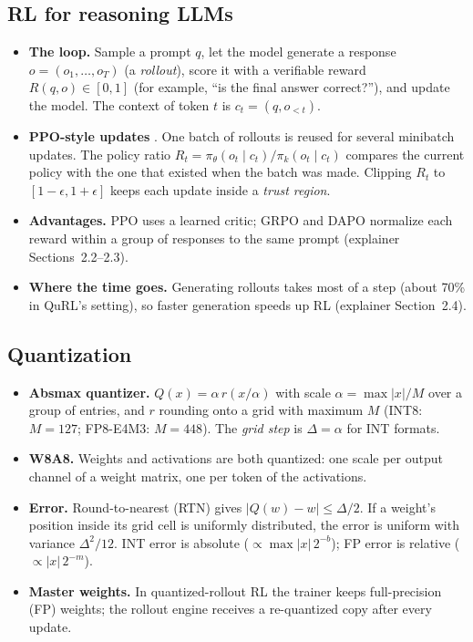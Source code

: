 \documentclass[11pt]{article}
\begin{document}
\subsection{RL for reasoning LLMs}
\begin{itemize}
\item \textbf{The loop.} Sample a prompt $q$, let the model generate a response $o=(o_1,\dots,o_T)$ (a \emph{rollout}), score it with a verifiable reward $R(q,o)\in[0,1]$ (for example, ``is the final answer correct?''), and update the model. The context of token $t$ is $c_t=(q,o_{<t})$.
\item \textbf{PPO-style updates} \citep{schulman2017ppo}. One batch of rollouts is reused for several minibatch updates. The policy ratio $R_t=\pi_\theta(o_t\mid c_t)/\pi_k(o_t\mid c_t)$ compares the current policy with the one that existed when the batch was made. Clipping $R_t$ to $[1-\epsilon,1+\epsilon]$ keeps each update inside a \emph{trust region}.
\item \textbf{Advantages.} PPO uses a learned critic; GRPO \citep{shao2024deepseekmath} and DAPO \citep{yu2025dapo} normalize each reward within a group of responses to the same prompt (explainer Sections~2.2--2.3).
\item \textbf{Where the time goes.} Generating rollouts takes most of a step (about 70\% in QuRL's setting), so faster generation speeds up RL (explainer Section~2.4).
\end{itemize}

\subsection{Quantization}
\begin{itemize}
\item \textbf{Absmax quantizer.} $Q(x)=\alpha\,r(x/\alpha)$ with scale $\alpha=\max|x|/M$ over a group of entries, and $r$ rounding onto a grid with maximum $M$ (INT8: $M=127$; FP8-E4M3: $M=448$). The \emph{grid step} is $\Delta=\alpha$ for INT formats.
\item \textbf{W8A8.} Weights and activations are both quantized: one scale per output channel of a weight matrix, one per token of the activations.
\item \textbf{Error.} Round-to-nearest (RTN) gives $|Q(w)-w|\le\Delta/2$. If a weight's position inside its grid cell is uniformly distributed, the error is uniform with variance $\Delta^2/12$. INT error is absolute ($\propto\max|x|\,2^{-b}$); FP error is relative ($\propto|x|\,2^{-m}$).
\item \textbf{Master weights.} In quantized-rollout RL the trainer keeps full-precision (FP) weights; the rollout engine receives a re-quantized copy after every update.
\end{itemize}
\end{document}
